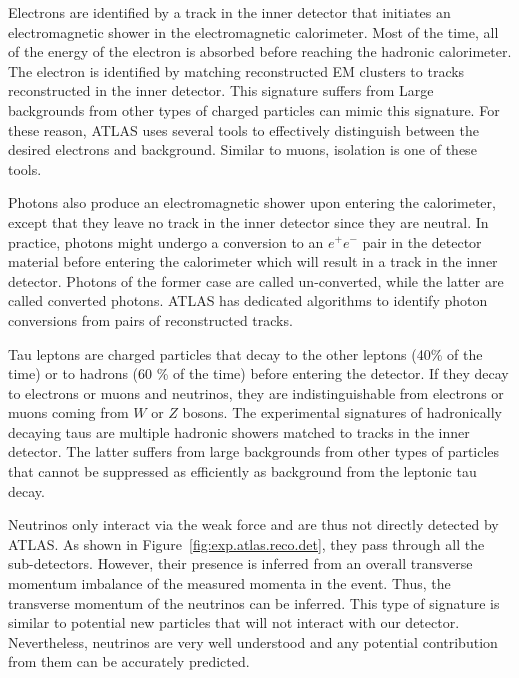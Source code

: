 Electrons are identified by a track in the inner detector that 
initiates  an electromagnetic
shower in the electromagnetic calorimeter. Most of the time,  
all of the energy of the electron is absorbed before reaching the hadronic 
calorimeter.
The electron is identified  by matching reconstructed EM clusters to tracks
reconstructed in the inner detector. 
This signature suffers from 
Large backgrounds from other types of charged particles can mimic this 
signature. For these reason, ATLAS uses several tools to effectively 
distinguish between the desired electrons and background.
Similar to muons, isolation is one of these tools.

Photons also produce an electromagnetic shower upon entering the calorimeter, 
except that they leave no track in the inner detector since they are neutral.
In practice, photons might undergo a conversion to an $e^+e^-$ pair 
in the detector material before entering the calorimeter which will 
result in a track in the inner detector. Photons of the former case 
are called un-converted, while the latter are called converted photons.
ATLAS has dedicated algorithms to identify photon conversions from 
pairs of reconstructed tracks.%

Tau leptons are charged particles that decay to the other leptons 
(40\% of the time) or to hadrons (60 \% of the time) before entering the detector.
If they decay to electrons or muons and neutrinos, they are indistinguishable from 
electrons or muons coming from $W$ or $Z$ bosons.
The experimental signatures of hadronically decaying taus are
multiple hadronic showers matched to tracks in the inner detector.
The latter suffers from large backgrounds 
from other types of particles that cannot be suppressed 
as efficiently as background from the leptonic tau decay.


Neutrinos only interact via the weak force
and are thus not directly detected by ATLAS.
As shown in Figure~\ref{fig:exp.atlas.reco.det}, 
they pass through all the sub-detectors.
However, their presence is inferred from an overall 
transverse momentum imbalance of the measured momenta in the event.
Thus, the transverse momentum of the neutrinos can be inferred.
This type of signature is similar to potential new particles 
that will not interact with our detector.
Nevertheless, neutrinos are very well understood
and any potential contribution from them can be accurately 
predicted.


